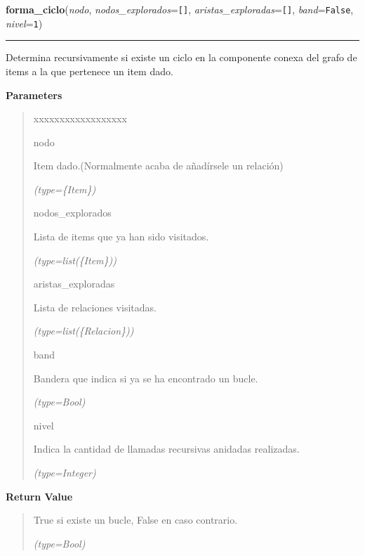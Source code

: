 \hspace{.8\funcindent}\begin{boxedminipage}{\funcwidth}

    \raggedright \textbf{forma\_ciclo}(\textit{nodo}, \textit{nodos\_explorados}={\tt []}, \textit{aristas\_exploradas}={\tt []}, \textit{band}={\tt False}, \textit{nivel}={\tt 1})

    \vspace{-1.5ex}

    \rule{\textwidth}{0.5\fboxrule}
\setlength{\parskip}{2ex}
    Determina recursivamente si existe un ciclo en la componente conexa del
    grafo de items a la que pertenece un item dado.

\setlength{\parskip}{1ex}
      \textbf{Parameters}
      \vspace{-1ex}

      \begin{quote}
        \begin{Ventry}{xxxxxxxxxxxxxxxxxx}

          \item[nodo]

          Item dado.(Normalmente acaba de añadírsele un relación)

            {\it (type=\{Item\})}

          \item[nodos\_explorados]

          Lista de items que ya han sido visitados.

            {\it (type=list(\{Item\}))}

          \item[aristas\_exploradas]

          Lista de relaciones visitadas.

            {\it (type=list(\{Relacion\}))}

          \item[band]

          Bandera que indica si ya se ha encontrado un bucle.

            {\it (type=Bool)}

          \item[nivel]

          Indica la cantidad de llamadas recursivas anidadas realizadas.

            {\it (type=Integer)}

        \end{Ventry}

      \end{quote}

      \textbf{Return Value}
    \vspace{-1ex}

      \begin{quote}
      True si existe un bucle, False en caso contrario.

      {\it (type=Bool)}

      \end{quote}

    \end{boxedminipage}


